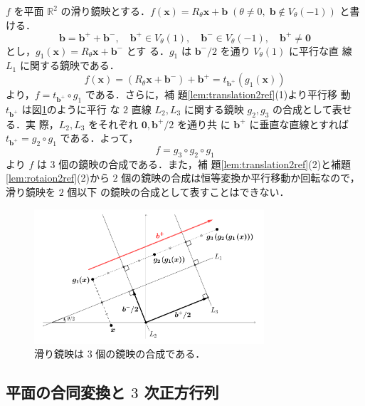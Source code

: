 \documentclass[11pt, uplatex, dvipdfmx, titlepage]{jsarticle}
\makeatletter
\renewenvironment{proof}[1][\proofname]{\par
  \pushQED{\qed}%
  \normalfont \topsep6\p@\@plus6\p@\relax
  \trivlist
  \item[\hskip\labelsep
         \bfseries
    {#1}]\ignorespaces
}{%
  \popQED\endtrivlist\@endpefalse
}
\theoremstyle{definition}
\renewcommand{\proofname}{\textbf{証明}}
\makeatother
\begin{document}
\begin{proof}
  $f$ を平面 $\mathbb{R}^2$
  の滑り鏡映とする．$f(\bm{x}) = R_{\theta}\bm{x} + \bm{b} \; (\theta
  \neq 0, \; \bm{b} \notin V_{\theta}(-1))$ と書ける．
  \[
    \bm{b} = \bm{b}^{+} + \bm{b}^{-}, \quad \bm{b}^{+} \in
    V_{\theta}(1), \quad \bm{b}^{-} \in V_{\theta}(-1),
    \quad \bm{b}^{+} \neq \bm{0}
  \]
  とし，$g_1(\bm{x}) = R_{\theta} \bm{x} + \bm{b}^{-}$ とす
  る．$g_1$ は $\bm{b}^{-}/2$ を通り $V_{\theta}(1)$ に平行な直
  線 $L_1$ に関する鏡映である．
  \[
    f(\bm{x}) = \left( R_{\theta}\bm{x} + \bm{b}^{-}\right) +
    \bm{b}^{+} = t_{\bm{b}^{+}}\left( g_1(\bm{x})\right)
  \]
  より，$f=t_{\bm{b}^{+}}\circ g_1$ である．さらに，補
  題\ref{lem:translation2ref}(1)より平行移
  動 $t_{\bm{b}^{+}}$ は図\ref{fig:glide2ref}のように平行
  な $2$ 直線 $L_2, L_3$ に関する鏡映 $g_2, g_3$ の合成として表せる．実
  際，$L_2, L_3$ をそれぞれ $\bm{0}, \bm{b}^{+}/2$ を通り共
  に $\bm{b}^{+}$ に垂直な直線とすれば $t_{\bm{b}^{+}} = g_2 \circ
  g_1$ である．よって，
  \[
    f = g_3 \circ g_2 \circ g_1
  \]
  より $f$ は $3$ 個の鏡映の合成である．また，補
  題\ref{lem:translation2ref}(2)と補題\ref{lem:rotaion2ref}(2)から $2$
  個の鏡映の合成は恒等変換か平行移動か回転なので，滑り鏡映を $2$ 個以下
  の鏡映の合成として表すことはできない．
  \begin{figure}[h]
    \centering
    \includegraphics[height=5cm]{pictures/glide2ref.pdf}
    \caption{滑り鏡映は $3$ 個の鏡映の合成である．}
    \label{fig:glide2ref}
  \end{figure}
\end{proof}



\subsection{平面の合同変換と $3$ 次正方行列}
\end{document}
